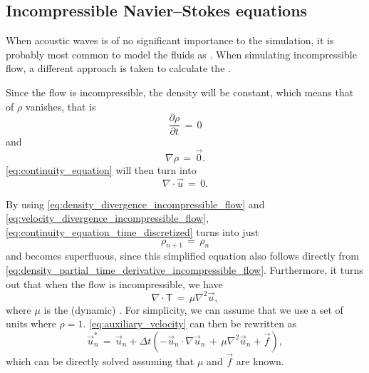\subsection{Incompressible Navier--Stokes equations}

When acoustic waves is of no significant importance to the simulation, it is probably most common to model the fluids as \incompressible. When simulating incompressible flow, a different approach is taken to calculate the .

Since the flow is incompressible, the density will be constant, which means that \derivatives of $\rho$ vanishes, that is
%
\begin{equation} \label{eq:density_partial_time_derivative_incompressible_flow}
\frac{\partial \rho}{\partial t} \,=\, 0
\end{equation}
%
and
%
\begin{equation} \label{eq:density_divergence_incompressible_flow}
\nabla\rho \,=\, \vec{0}.
\end{equation}
%
\eqref{eq:continuity_equation} will then turn into
%
\begin{equation} \label{eq:velocity_divergence_incompressible_flow}
\nabla\cdot\vec{u} \,=\, 0.
\end{equation}

By using \eqref{eq:density_divergence_incompressible_flow} and \eqref{eq:velocity_divergence_incompressible_flow}, \eqref{eq:continuity_equation_time_discretized} turns into just
%
\begin{equation} \label{eq:continuity_equation_superfluous}
{\rho_{n+1} \,=\, \rho_n}
\end{equation}
%
and becomes superfluous, since this simplified equation also follows directly from \eqref{eq:density_partial_time_derivative_incompressible_flow}. Furthermore, it turns out that when the flow is incompressible, we have
%
\begin{equation} \label{eq:deviatoric_stress_tensor_incompressible_flow}
\nabla\cdot\boldsymbol{\mathsf{T}} \,=\, \mu\nabla^2\vec{u},
\end{equation}
%
where $\mu$ is the (dynamic) \viscosity. For simplicity, we can assume that we use a set of units where $\rho = 1$. \eqref{eq:auxiliary_velocity} can then be rewritten as
%
\begin{equation} \label{eq:auxiliary_velocity_reduced}
\vec{u}^*_n \,= \, \vec{u}_{n} + \Delta t(- \vec{u}_{n}\cdot\nabla\vec{u}_{n} \,+\, \mu\nabla^2\vec{u}_{n} + \vec{f}),
\end{equation}
%
which can be directly solved assuming that $\mu$ and $\vec{f}$ are known.

